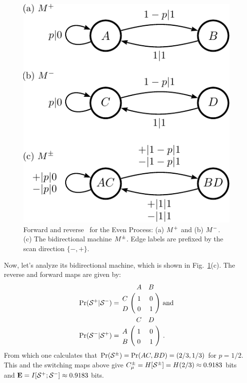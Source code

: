 \begin{figure}[th]
\centering
\includegraphics[scale=\figscale]{../chapter2/figures/EvenProcess}
\caption{
  Forward and reverse \eMs\ for the Even Process: (a) ${M}^{+}$ and
  (b) ${M}^{-}$. (c) The bidirectional machine ${M}^{\pm}$.
  Edge labels are prefixed by the scan direction $\{-,+\}$.
  }
\label{fig:EvenProcess}
\end{figure}

Now, let's analyze its bidirectional machine, which is shown in 
Fig.~\ref{fig:EvenProcess}(c). The reverse and forward maps are given by:
\begin{align*}
\Pr(\FutureCausalState|\PastCausalState) &=
  \bordermatrix{%
      & A & B \cr
    C & 1 & 0 \cr
    D & 0 & 1
  }
  \mathrm{~and}\\
\Pr(\PastCausalState|\FutureCausalState) &=
  \bordermatrix{%
      & C & D \cr
    A & 1 & 0 \cr
    B & 0 & 1
  } ~.
\end{align*}
From which one calculates that
$\Pr({\mathcal{S}}^{\pm}) = \Pr(AC,BD) = \left(2/3,1/3\right)$ for $p=1/2$. 
This and the switching maps above give 
    $C_\mu^{\pm} = H[{\mathcal{S}}^{\pm}] = H(2/3) \approx 0.9183$
bits and ${\bf E} = I[{\mathcal{S}}^{+};{\mathcal{S}}^{-}] \approx 0.9183$ bits.

